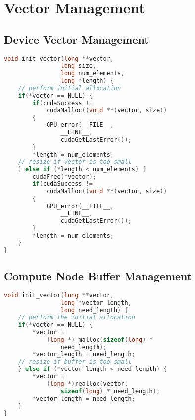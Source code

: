 \chapter{Vector Management} \label{chap:VectorManagement}
\section{Device Vector Management} \label{sec:DeviceVectorManagement}
\begin{lstlisting}[language=C,caption={Device Vector Management}]
void init_vector(long **vector, 
                long size, 
                long num_elements, 
                long *length) {
    // perform initial allocation
	if(*vector == NULL) {
		if(cudaSuccess != 
		    cudaMalloc((void **)vector, size))
		{
		    GPU_error(__FILE__, 
		        __LINE__, 
		        cudaGetLastError());
		}
		*length = num_elements;
	// resize if vector is too small
	} else if (*length < num_elements) {
		cudaFree(*vector);
		if(cudaSuccess != 
		    cudaMalloc((void **)vector, size)) 
		{
		    GPU_error(__FILE__, 
		        __LINE__, 
		        cudaGetLastError());
		}
		*length = num_elements;
	}
}
\end{lstlisting}

\section{Compute Node Buffer Management} \label{sec:ComputeNodeBufferManagement}
\begin{lstlisting}[language=C,caption={Compute Node Buffer Management}]
void init_vector(long **vector, 
                long *vector_length, 
                long need_length) {
    // perform the initial allocation
	if(*vector == NULL) {
		*vector = 
		    (long *) malloc(sizeof(long) * 
		        need_length);
		*vector_length = need_length;
    // resize if buffer is too small
	} else if (*vector_length < need_length) {
		*vector = 
		    (long *)realloc(vector, 
		        sizeof(long) * need_length); 
		*vector_length = need_length;
	}
}
\end{lstlisting}